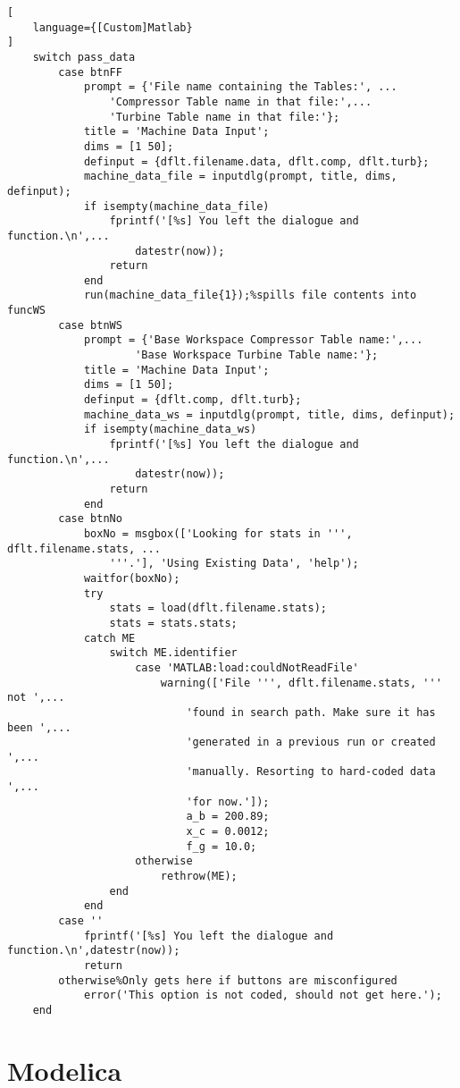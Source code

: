 \begin{lstlisting}[
    language={[Custom]Matlab}
]
    switch pass_data
        case btnFF
            prompt = {'File name containing the Tables:', ...
                'Compressor Table name in that file:',...
                'Turbine Table name in that file:'};
            title = 'Machine Data Input';
            dims = [1 50];
            definput = {dflt.filename.data, dflt.comp, dflt.turb};
            machine_data_file = inputdlg(prompt, title, dims, definput);
            if isempty(machine_data_file)
                fprintf('[%s] You left the dialogue and function.\n',...
                    datestr(now));
                return
            end
            run(machine_data_file{1});%spills file contents into funcWS
        case btnWS
            prompt = {'Base Workspace Compressor Table name:',...
                    'Base Workspace Turbine Table name:'};
            title = 'Machine Data Input';
            dims = [1 50];
            definput = {dflt.comp, dflt.turb};
            machine_data_ws = inputdlg(prompt, title, dims, definput);
            if isempty(machine_data_ws)
                fprintf('[%s] You left the dialogue and function.\n',...
                    datestr(now));
                return
            end
        case btnNo
            boxNo = msgbox(['Looking for stats in ''', dflt.filename.stats, ...
                '''.'], 'Using Existing Data', 'help');
            waitfor(boxNo);
            try
                stats = load(dflt.filename.stats);
                stats = stats.stats;
            catch ME
                switch ME.identifier
                    case 'MATLAB:load:couldNotReadFile'
                        warning(['File ''', dflt.filename.stats, ''' not ',...
                            'found in search path. Make sure it has been ',...
                            'generated in a previous run or created ',...
                            'manually. Resorting to hard-coded data ',...
                            'for now.']);
                            a_b = 200.89;
                            x_c = 0.0012;
                            f_g = 10.0;
                    otherwise
                        rethrow(ME);
                end
            end
        case ''
            fprintf('[%s] You left the dialogue and function.\n',datestr(now));
            return
        otherwise%Only gets here if buttons are misconfigured
            error('This option is not coded, should not get here.');
    end
\end{lstlisting}

\section{Modelica}

